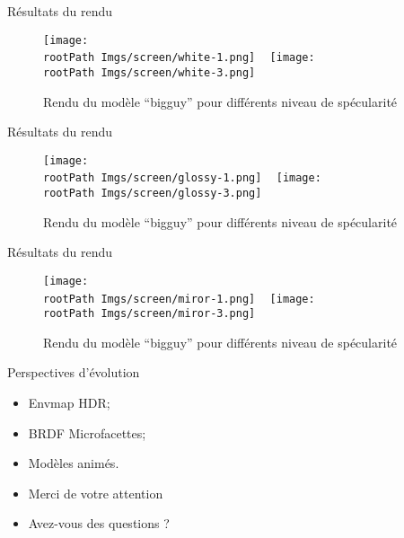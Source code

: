 \documentclass{beamer}
\newcommand*{\rootPath}{}
\begin{document}
\begin{frame}{Résultats du rendu}
	\begin{figure}
		\centering
			\texttt{[image: \\rootPath Imgs/screen/white-1.png]}
			~
			\texttt{[image: \\rootPath Imgs/screen/white-3.png]}
		\caption{Rendu du modèle “bigguy” pour différents niveau de spécularité}
	\end{figure}
\end{frame}
\begin{frame}{Résultats du rendu}
	\begin{figure}
		\centering
			\texttt{[image: \\rootPath Imgs/screen/glossy-1.png]}
			~
			\texttt{[image: \\rootPath Imgs/screen/glossy-3.png]}
		\caption{Rendu du modèle “bigguy” pour différents niveau de spécularité}
	\end{figure}
\end{frame}
\begin{frame}{Résultats du rendu}
	\begin{figure}
		\centering
			\texttt{[image: \\rootPath Imgs/screen/miror-1.png]}
			~
			\texttt{[image: \\rootPath Imgs/screen/miror-3.png]}			
		\caption{Rendu du modèle “bigguy” pour différents niveau de spécularité}
	\end{figure}
\end{frame}

\begin{frame}{Perspectives d'évolution}
	\begin{itemize}
		\item Envmap HDR;
		\item BRDF Microfacettes;
		\item Modèles animés.
	\end{itemize}
\end{frame}


\begin{frame}
	\begin{itemize}
		\item Merci de votre attention
		\item Avez-vous des questions ?
	\end{itemize}
\end{frame}
\end{document}
